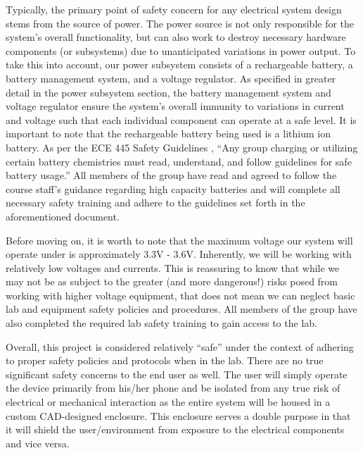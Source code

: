 \documentclass[12pt]{article}
\begin{document}
Typically, the primary point of safety concern for any electrical system design stems from the source of power. The power source is not only responsible for the system's overall functionality, but can also work to destroy necessary hardware components (or subsystems) due to unanticipated variations in power output. To take this into account, our power subsystem consists of a rechargeable battery, a battery management system, and a voltage regulator. As specified in greater detail in the power subsystem section, the battery management system and voltage regulator ensure the system's overall immunity to variations in current and voltage such that each individual component can operate at a safe level. It is important to note that the rechargeable battery being used is a lithium ion battery. As per the ECE 445 Safety Guidelines \cite{445_safety}, ``Any group charging or utilizing certain battery chemistries must read, understand, and follow guidelines for safe battery usage.'' All members of the group have read and agreed to follow the course staff's guidance regarding high capacity batteries \cite{Li_safety} and will complete all necessary safety training and adhere to the guidelines set forth in the aforementioned document. 

Before moving on, it is worth to note that the maximum voltage our system will operate under is approximately 3.3V - 3.6V. Inherently, we will be working with relatively low voltages and currents. This is reassuring to know that while we may not be as subject to the greater (and more dangerous!) risks posed from working with higher voltage equipment, that does not mean we can neglect basic lab and equipment safety policies and procedures. All members of the group have also completed the required lab safety training to gain access to the lab. 

Overall, this project is considered relatively ``safe'' under the context of adhering to proper safety policies and protocols when in the lab. There are no true significant safety concerns to the end user as well. The user will simply operate the device primarily from his/her phone and be isolated from any true risk of electrical or mechanical interaction as the entire system will be housed in a custom CAD-designed enclosure. This enclosure serves a double purpose in that it will shield the user/environment from exposure to the electrical components and vice versa. 



\end{document}
